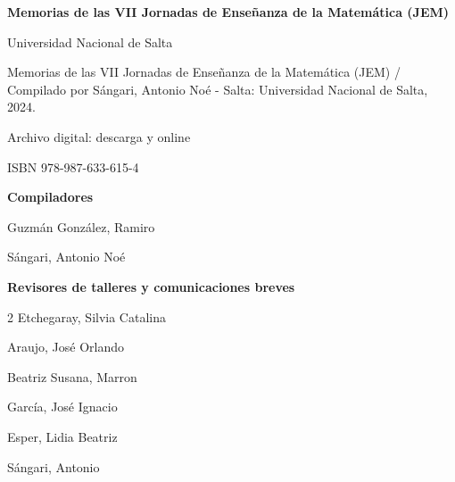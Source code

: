 \setcounter{page}{1}

\begin{center}
	\LARGE \bfseries \sffamily
	Memorias de las VII Jornadas de Enseñanza de la Matemática (JEM)
\end{center}

\vspace*{2.5mm}

\begin{center}
	\begin{tcolorbox}[colback=white, arc=0mm, width=10cm, boxrule=0.5pt]
		\footnotesize
		Universidad Nacional de Salta
		
		\hspace*{1em} Memorias de las VII Jornadas de Enseñanza de la Matemática (JEM) / Compilado por Sángari, Antonio Noé - Salta: Universidad Nacional de Salta, 2024.
		
		\vspace*{1em}
		
		\hspace*{1em} Archivo digital: descarga y online
		
		\hspace*{1em} ISBN 978-987-633-615-4		
	\end{tcolorbox}
\end{center}

\vspace*{2.5mm}

\begin{center}
	\sffamily \Large \bfseries Compiladores
	\vspace*{1mm}
	
	\large \normalfont
	Guzmán González, Ramiro 
	
	Sángari, Antonio Noé 
\end{center}

\vspace*{5mm}

\begin{center}
	\sffamily \Large \bfseries Revisores de talleres y comunicaciones breves
	\large \normalfont
	\begin{multicols}{2}
		 Etchegaray, Silvia Catalina
		 
		 Araujo, José Orlando
		 
		 Beatriz Susana, Marron
		 
		 García, José Ignacio
		 
		 Esper, Lidia Beatriz
		 
		 Sángari, Antonio
	\end{multicols}
\end{center}

